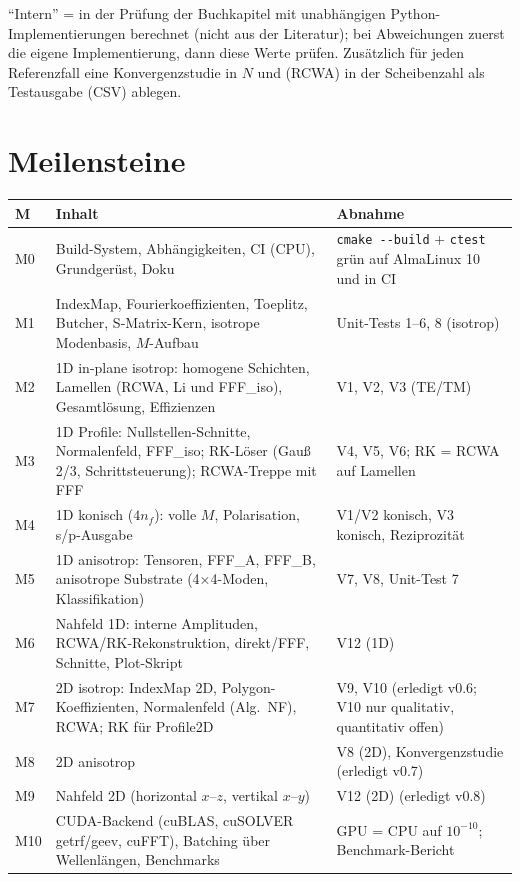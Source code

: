 \enquote{Intern} = in der Prüfung der Buchkapitel mit unabhängigen Python-Implementierungen berechnet
(nicht aus der Literatur); bei Abweichungen zuerst die eigene Implementierung, dann diese Werte prüfen.
Zusätzlich für jeden Referenzfall eine Konvergenzstudie in $N$ und (RCWA) in der Scheibenzahl als
Testausgabe (CSV) ablegen.

\section{Meilensteine}\label{sec:milestones}
\begin{longtable}{p{1.0cm}p{6.6cm}p{6.6cm}}
\toprule
M & Inhalt & Abnahme \\
\midrule
\endhead
M0 & Build-System, Abhängigkeiten, CI (CPU), Grundgerüst, Doku & \verb|cmake --build| + \verb|ctest| grün auf AlmaLinux 10 und in CI \\
M1 & IndexMap, Fourierkoeffizienten, Toeplitz, Butcher, S-Matrix-Kern, isotrope Modenbasis, $M$-Aufbau & Unit-Tests 1--6, 8 (isotrop) \\
M2 & 1D in-plane isotrop: homogene Schichten, Lamellen (RCWA, Li und FFF\_iso), Gesamtlösung, Effizienzen & V1, V2, V3 (TE/TM) \\
M3 & 1D Profile: Nullstellen-Schnitte, Normalenfeld, FFF\_iso; RK-Löser (Gauß 2/3, Schrittsteuerung); RCWA-Treppe mit FFF & V4, V5, V6; RK = RCWA auf Lamellen \\
M4 & 1D konisch ($4n_f$): volle $M$, Polarisation, s/p-Ausgabe & V1/V2 konisch, V3 konisch, Reziprozität \\
M5 & 1D anisotrop: Tensoren, FFF\_A, FFF\_B, anisotrope Substrate (4×4-Moden, Klassifikation) & V7, V8, Unit-Test 7 \\
M6 & Nahfeld 1D: interne Amplituden, RCWA/RK-Rekonstruktion, direkt/FFF, Schnitte, Plot-Skript & V12 (1D) \\
M7 & 2D isotrop: IndexMap 2D, Polygon-Koeffizienten, Normalenfeld (Alg.\ NF), RCWA; RK für Profile2D & V9, V10
  (erledigt v0.6; V10 nur qualitativ, quantitativ offen) \\
M8 & 2D anisotrop & V8 (2D), Konvergenzstudie (erledigt v0.7) \\
M9 & Nahfeld 2D (horizontal $x$--$z$, vertikal $x$--$y$) & V12 (2D) (erledigt v0.8) \\
M10 & CUDA-Backend (cuBLAS, cuSOLVER getrf/geev, cuFFT), Batching über Wellenlängen, Benchmarks & GPU = CPU auf $10^{-10}$; Benchmark-Bericht

\end{longtable}
